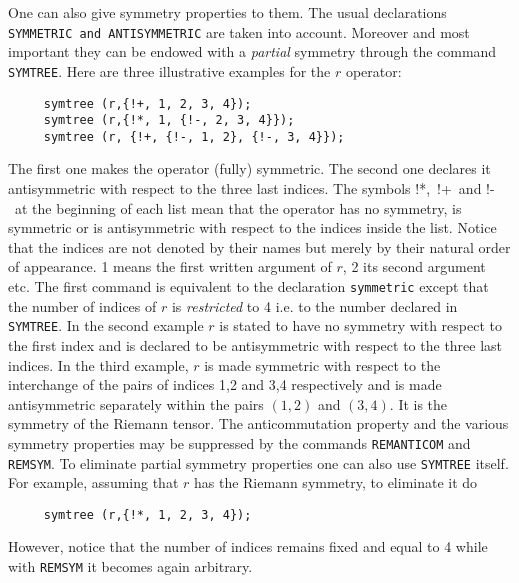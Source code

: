 One can also give symmetry properties to them. The usual declarations
{\tt SYMMETRIC and AN\-TI\-SYM\-ME\-TRIC} are taken into account. Moreover
and most important they can be endowed with a {\em partial} symmetry 
through the command {\tt SYMTREE}.
Here are three illustrative examples for the $r$ operator:
\begin{verbatim}
     symtree (r,{!+, 1, 2, 3, 4});
     symtree (r,{!*, 1, {!-, 2, 3, 4}});
     symtree (r, {!+, {!-, 1, 2}, {!-, 3, 4}});
\end{verbatim}
The first one makes the operator (fully) symmetric.
The second one declares it antisymmetric with respect 
to the three last indices. 
The symbols !*,\  !+\  and !-\  at the beginning of each list mean that
the operator has no symmetry, is symmetric or is antisymmetric with respect
to the indices inside the list. Notice that the indices are not denoted
by their names but merely by their natural order of appearance. 1 means the
first written argument of $r$, 2 its second argument etc.
The first command is equivalent to the declaration {\tt symmetric}
except that the number of indices of $r$ is {\em restricted} to 
4 i.e. to the number declared in {\tt SYMTREE}.
In the second example $r$  is stated to have no symmetry with respect 
to the  first index and is declared  to be antisymmetric with respect 
to the three last indices. In the third example, $r$ is made symmetric 
with respect to the interchange  of the pairs of indices 1,2 
and 3,4 respectively and is made antisymmetric separately within
the pairs $(1,2)$ and $(3,4)$. It is the symmetry of the Riemann tensor.
The anticommutation property and the various 
symmetry properties may be suppressed by the commands {\tt REMANTICOM} and 
{\tt REMSYM}. To eliminate partial symmetry properties one can also use 
{\tt SYMTREE}  itself. For example, assuming that $r$ has the Riemann symmetry,
to eliminate it do
\begin{verbatim}
     symtree (r,{!*, 1, 2, 3, 4});  
\end{verbatim}
However, notice that the number of indices remains fixed and equal to 4
while with {\tt REMSYM} it becomes again arbitrary.
